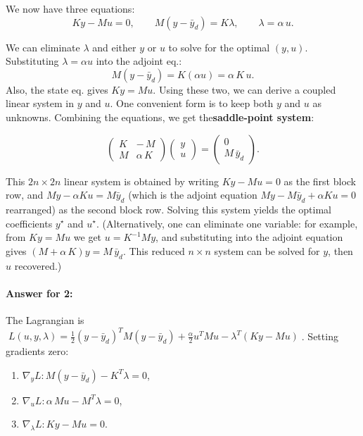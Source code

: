 We now have three equations:
\[
	K y - M u = 0, \qquad M(y - \bar y_d) = K\lambda, \qquad \lambda = \alpha\,u.
\]

We can eliminate \(\lambda\) and either \(y\) or \(u\) to solve for the optimal \((y,u)\). Substituting \(\lambda=\alpha u\) into the adjoint eq.:
\[M(y - \bar y_d) = K(\alpha u) = \alpha\,K\,u.\]
Also, the state eq. gives \(K y = M u\). Using these two, we can derive a coupled linear system in \(y\) and \(u\). One convenient form is to keep both \(y\) and \(u\) as unknowns. Combining the equations, we get the\textbf{saddle-point system}:

\[
	\begin{pmatrix} K & -\,M      \\[6pt]
                M & \alpha\,K\end{pmatrix}
	\begin{pmatrix}
		y \\[3pt] u
	\end{pmatrix} =
	\begin{pmatrix}
		0 \\[3pt]
		M\,\bar y_d
	\end{pmatrix}.
\]

This \(2n\times 2n\) linear system is obtained by writing \(K y - M u = 0\) as the first block row, and \(M y - \alpha K u = M \bar y_d\) (which is the adjoint equation \(M y - M \bar y_d + \alpha K u=0\) rearranged) as the second block row.  Solving this system yields the optimal coefficients \(y^\star\) and \(u^\star\).  (Alternatively, one can eliminate one variable: for example, from \(K y=M u\) we get \(u = K^{-1} M y\), and substituting into the adjoint equation gives \((M + \alpha\,K) y = M\,\bar y_d\). This reduced \(n\times n\) system can be solved for \(y\), then \(u\) recovered.)

\paragraph{Answer for 2:}
The Lagrangian is \(\;L(u,y,\lambda) = \frac{1}{2}(y-\bar y_d)^T M (y-\bar y_d) + \frac{\alpha}{2} u^T M u - \lambda^T(Ky - M u)\;\).
Setting gradients zero:
\begin{enumerate}
	\item \(\nabla_y L: M(y-\bar y_d) - K^T\lambda = 0\),
	\item \(\nabla_u L: \alpha\,M u - M^T\lambda = 0\),
	\item \(\nabla_\lambda L: K y - M u = 0\).
\end{enumerate}


